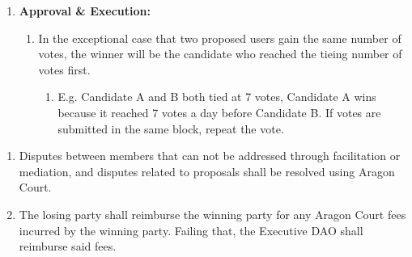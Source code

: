 \begin{enumerate}
\begin{enumerate}
\begin{enumerate}
			\item \textbf{Approval \& Execution:}
			\begin{enumerate}
				\item In the exceptional case that two proposed users gain the same number of votes, the winner will be the candidate who reached the tieing number of votes first.
				\begin{enumerate}
					\item E.g. Candidate A and B both tied at 7 votes, Candidate A wins because it reached 7 votes a day before Candidate B. If votes are submitted in the same block, repeat the vote.
				\end{enumerate}
			\end{enumerate}
		\end{enumerate}
	\end{enumerate}
	
	\begin{enumerate}
		\item Disputes between members that can not be addressed through facilitation or mediation, and disputes related to proposals shall be resolved using Aragon Court.
		\item The losing party shall reimburse the winning party for any Aragon Court fees incurred by the winning party. Failing that, the Executive \ac{DAO} shall reimburse said fees.
	\end{enumerate}
\end{enumerate}